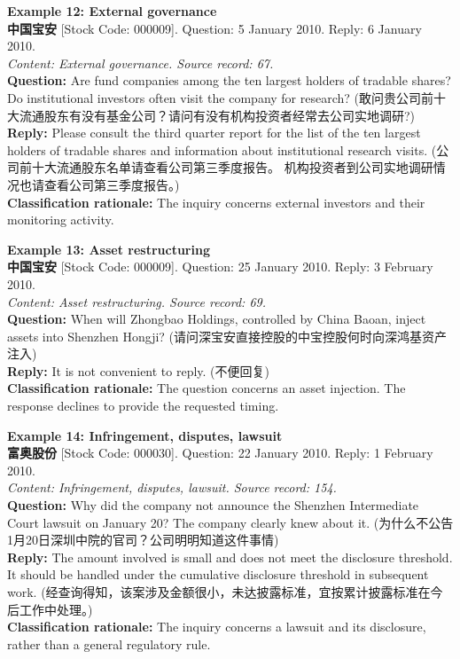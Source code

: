 \clearpage
\noindent \textbf{Example 12: External governance} \\
\textbf{中国宝安} [Stock Code: 000009]. Question: 5 January 2010. Reply: 6 January 2010. \\
\textit{Content: External governance. Source record: 67.} \\
\textbf{Question:} Are fund companies among the ten largest holders of tradable shares? Do institutional investors often visit the company for research? (敢问贵公司前十大流通股东有没有基金公司？请问有没有机构投资者经常去公司实地调研?) \\
\textbf{Reply:} Please consult the third quarter report for the list of the ten largest holders of tradable shares and information about institutional research visits. (公司前十大流通股东名单请查看公司第三季度报告。 机构投资者到公司实地调研情况也请查看公司第三季度报告。) \\
\textbf{Classification rationale:} The inquiry concerns external investors and their monitoring activity.

\vspace{0.4cm}
\noindent \textbf{Example 13: Asset restructuring} \\
\textbf{中国宝安} [Stock Code: 000009]. Question: 25 January 2010. Reply: 3 February 2010. \\
\textit{Content: Asset restructuring. Source record: 69.} \\
\textbf{Question:} When will Zhongbao Holdings, controlled by China Baoan, inject assets into Shenzhen Hongji? (请问深宝安直接控股的中宝控股何时向深鸿基资产注入) \\
\textbf{Reply:} It is not convenient to reply. (不便回复) \\
\textbf{Classification rationale:} The question concerns an asset injection. The response declines to provide the requested timing.

\clearpage
\noindent \textbf{Example 14: Infringement, disputes, lawsuit} \\
\textbf{富奥股份} [Stock Code: 000030]. Question: 22 January 2010. Reply: 1 February 2010. \\
\textit{Content: Infringement, disputes, lawsuit. Source record: 154.} \\
\textbf{Question:} Why did the company not announce the Shenzhen Intermediate Court lawsuit on January 20? The company clearly knew about it. (为什么不公告1月20日深圳中院的官司？公司明明知道这件事情) \\
\textbf{Reply:} The amount involved is small and does not meet the disclosure threshold. It should be handled under the cumulative disclosure threshold in subsequent work. (经查询得知，该案涉及金额很小，未达披露标准，宜按累计披露标准在今后工作中处理。) \\
\textbf{Classification rationale:} The inquiry concerns a lawsuit and its disclosure, rather than a general regulatory rule.

